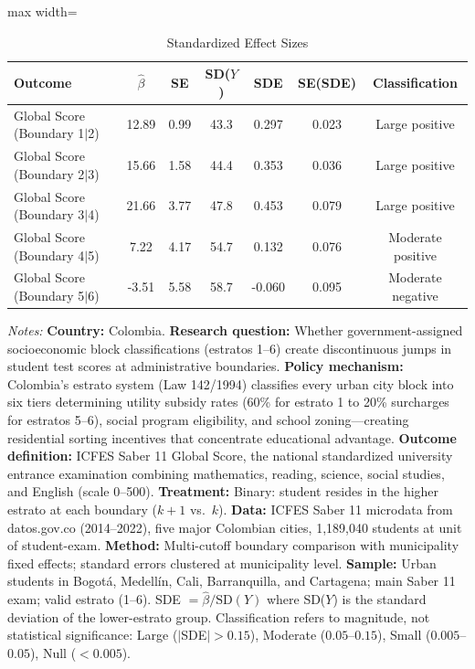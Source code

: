 \begin{table}[htbp]
\centering
\caption{Standardized Effect Sizes}
\label{tab:sde}
\begin{adjustbox}{max width=\textwidth}
\begin{tabular}{lcccccc}
\toprule
Outcome & $\hat{\beta}$ & SE & SD($Y$) & SDE & SE(SDE) & Classification \\
\midrule
Global Score (Boundary 1$|$2) & 12.89 & 0.99 & 43.3 & 0.297 & 0.023 & Large positive \\
Global Score (Boundary 2$|$3) & 15.66 & 1.58 & 44.4 & 0.353 & 0.036 & Large positive \\
Global Score (Boundary 3$|$4) & 21.66 & 3.77 & 47.8 & 0.453 & 0.079 & Large positive \\
Global Score (Boundary 4$|$5) & 7.22 & 4.17 & 54.7 & 0.132 & 0.076 & Moderate positive \\
Global Score (Boundary 5$|$6) & -3.51 & 5.58 & 58.7 & -0.060 & 0.095 & Moderate negative \\
\bottomrule
\end{tabular}
\end{adjustbox}
\par\vspace{0.3em}
\begin{minipage}{\textwidth}
{\footnotesize \textit{Notes:} \textbf{Country:} Colombia. \textbf{Research question:} Whether government-assigned socioeconomic block classifications (estratos 1--6) create discontinuous jumps in student test scores at administrative boundaries. \textbf{Policy mechanism:} Colombia's estrato system (Law 142/1994) classifies every urban city block into six tiers determining utility subsidy rates (60\% for estrato 1 to 20\% surcharges for estratos 5--6), social program eligibility, and school zoning---creating residential sorting incentives that concentrate educational advantage. \textbf{Outcome definition:} ICFES Saber 11 Global Score, the national standardized university entrance examination combining mathematics, reading, science, social studies, and English (scale 0--500). \textbf{Treatment:} Binary: student resides in the higher estrato at each boundary ($k+1$ vs.~$k$). \textbf{Data:} ICFES Saber 11 microdata from datos.gov.co (2014--2022), five major Colombian cities, 1,189,040 students at unit of student-exam. \textbf{Method:} Multi-cutoff boundary comparison with municipality fixed effects; standard errors clustered at municipality level. \textbf{Sample:} Urban students in Bogot\'a, Medell\'in, Cali, Barranquilla, and Cartagena; main Saber 11 exam; valid estrato (1--6). SDE $= \hat{\beta} / \text{SD}(Y)$ where SD($Y$) is the standard deviation of the lower-estrato group. Classification refers to magnitude, not statistical significance: Large ($|$SDE$| > 0.15$), Moderate ($0.05$--$0.15$), Small ($0.005$--$0.05$), Null ($< 0.005$).}
\end{minipage}
\end{table}
